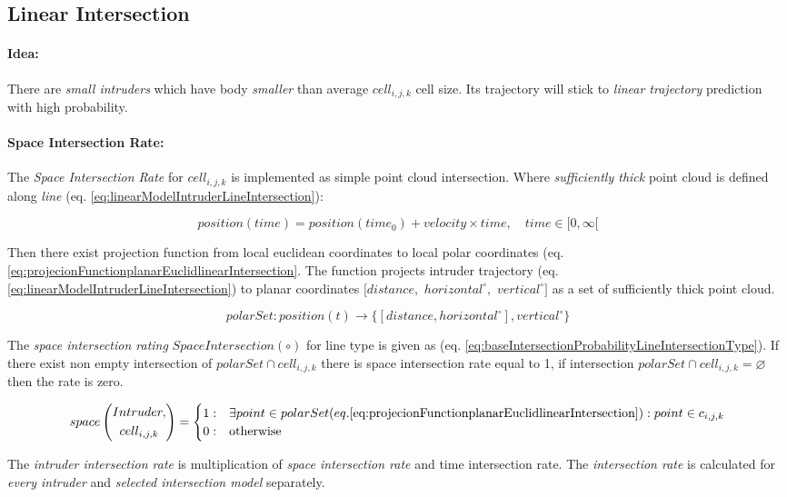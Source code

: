 \subsection{Linear Intersection}\label{s:linearIntersectionModel}
\paragraph{Idea:} There are \emph{small intruders} which have body \emph{smaller} than average $cell_{i,j,k}$ cell size. Its trajectory will stick to \emph{linear trajectory} prediction with high probability. 

\paragraph{Space Intersection Rate:} The \emph{Space Intersection Rate} for $cell_{i,j,k}$ is implemented as simple point cloud intersection. Where \emph{sufficiently thick} point cloud is defined along \emph{line} (eq. \ref{eq:linearModelIntruderLineIntersection}):

\begin{equation}\label{eq:linearModelIntruderLineIntersection}
    position(time) = position(time_0) + velocity \times time,\quad time \in [0,\infty[
\end{equation}

Then there exist projection function from local euclidean coordinates to local polar coordinates (eq. \ref{eq:projecionFunctionplanarEuclidlinearIntersection}. The function projects intruder trajectory (eq. \ref{eq:linearModelIntruderLineIntersection}) to planar coordinates $[distance,$ $horizontal^\circ,$ $vertical^\circ]$  as a set of sufficiently thick point cloud.

\begin{equation}\label{eq:projecionFunctionplanarEuclidlinearIntersection}
    polarSet:position(t)\to\{[distance, horizontal^\circ], vertical^\circ\}
\end{equation}


\noindent The \emph{space intersection rating} $SpaceIntersection(\circ)$ for line type is given as (eq. \ref{eq:baseIntersectionProbabilityLineIntersectionType}). If there exist non empty intersection of $polarSet\cap cell_{i,j,k}$ there is space intersection rate equal to  1, if intersection $polarSet\cap cell_{i,j,k} = \varnothing$ then the rate is zero.

\begin{equation}\label{eq:baseIntersectionProbabilityLineIntersectionType}
    space\left(\begin{gathered}Intruder,\\cell_{i,j,k}\end{gathered}\right)=
    \begin{cases}
        1:&\exists point \in polarSet(eq.\ref{eq:projecionFunctionplanarEuclidlinearIntersection}): point \in c_{i,j,k}\\
        0:&\text{otherwise}
    \end{cases}
\end{equation}

\begin{note}
    The \emph{intruder intersection rate} is multiplication of \emph{space intersection rate} and time intersection rate. The \emph{intersection rate} is calculated for \emph{every intruder} and \emph{selected intersection model} separately.
\end{note}
